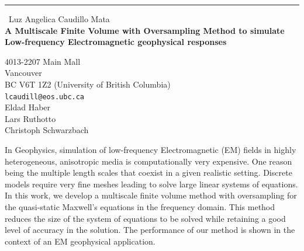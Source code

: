 \documentclass{report}
\begin{document}
\begin{center}
\rule{6in}{1pt} \
{\large Luz Angelica Caudillo Mata \\
{\bf A Multiscale Finite Volume with Oversampling Method to simulate Low-frequency Electromagnetic geophysical responses}}

4013-2207 Main Mall \\ Vancouver \\ BC V6T 1Z2 (University of British Columbia)
\\
{\tt lcaudill@eos.ubc.ca}\\
Eldad Haber\\
Lars Ruthotto\\
Christoph Schwarzbach\end{center}

In Geophysics, simulation of low-frequency Electromagnetic (EM) fields in
highly heterogeneous, anisotropic media is computationally very
expensive. One reason being the multiple length scales that coexist in a
given realistic setting. Discrete models require very fine meshes leading
to solve large linear systems of equations. In this work, we develop a
multiscale finite volume method with oversampling for the quasi-static
Maxwell's equations in the frequency domain. This method reduces the size
of the system of equations to be solved while retaining a good level of
accuracy in the solution. The performance of our method is shown in the
context of an EM geophysical application.
\end{document}
